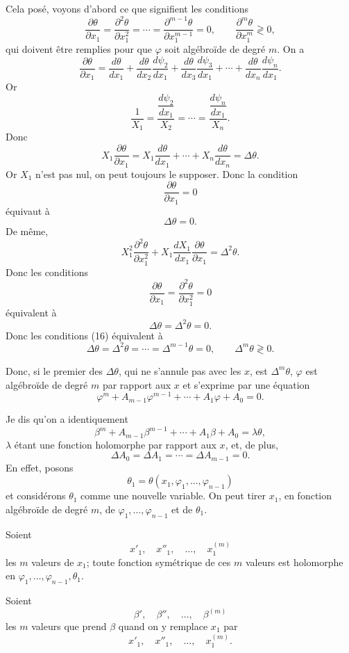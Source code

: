 \documentclass[11pt]{article}
\begin{document}
Cela posé, voyons d’abord ce que signifient les conditions
\begin{equation*}\tag{16}
\frac{\partial\theta}{\partial x_1}
=\frac{\partial^2\theta}{\partial x_1^2}
=\cdots=
\frac{\partial^{m-1}\theta}{\partial x_1^{m-1}}=0,
\qquad
\frac{\partial^m\theta}{\partial x_1^m}\gtrless0,
\end{equation*}
qui doivent être remplies pour que $\varphi$ soit algébroïde de degré $m$. On a
\[
\frac{\partial\theta}{\partial x_1}
=
\frac{d\theta}{dx_1}
+\frac{d\theta}{dx_2}\frac{d\psi_2}{dx_1}
+\frac{d\theta}{dx_3}\frac{d\psi_3}{dx_1}
+\cdots+
\frac{d\theta}{dx_n}\frac{d\psi_n}{dx_1}.
\]
Or
\[
\frac{1}{X_1}
=
\frac{\dfrac{d\psi_2}{dx_1}}{X_2}
=\cdots=
\frac{\dfrac{d\psi_n}{dx_1}}{X_n}.
\]
Donc
\[
X_1\frac{\partial\theta}{\partial x_1}
=
X_1\frac{d\theta}{dx_1}+\cdots+X_n\frac{d\theta}{dx_n}
=\Delta\theta.
\]
Or $X_1$ n’est pas nul, on peut toujours le supposer. Donc la condition
\[
\frac{\partial\theta}{\partial x_1}=0
\]
équivaut à
\[
\Delta\theta=0.
\]
De même,
\[
X_1^2\frac{\partial^2\theta}{\partial x_1^2}
+X_1\frac{dX_1}{dx_1}\frac{\partial\theta}{\partial x_1}
=\Delta^2\theta.
\]
Donc les conditions
\[
\frac{\partial\theta}{\partial x_1}
=
\frac{\partial^2\theta}{\partial x_1^2}
=0
\]
équivalent à
\[
\Delta\theta=\Delta^2\theta=0.
\]
Donc les conditions (16) équivalent à
\[
\Delta\theta=\Delta^2\theta=\cdots=\Delta^{m-1}\theta=0,
\qquad
\Delta^m\theta\gtrless0.
\]

Donc, si le premier des $\Delta\theta$, qui ne s’annule pas avec les $x$, est $\Delta^m\theta$, $\varphi$ est algébroïde de degré $m$ par rapport aux $x$ et s’exprime par une équation
\[
\varphi^m+A_{m-1}\varphi^{m-1}+\cdots+A_1\varphi+A_0=0.
\]

Je dis qu’on a identiquement
\[
\beta^m+A_{m-1}\beta^{m-1}+\cdots+A_1\beta+A_0=\lambda\theta,
\]
$\lambda$ étant une fonction holomorphe par rapport aux $x$, et, de plus,
\[
\Delta A_0=\Delta A_1=\cdots=\Delta A_{m-1}=0.
\]
En effet, posons
\[
\theta_1=\theta(x_1,\varphi_1,\ldots,\varphi_{n-1})
\]
et considérons $\theta_1$ comme une nouvelle variable. On peut tirer $x_1$, en fonction algébroïde de degré $m$, de $\varphi_1,\ldots,\varphi_{n-1}$ et de $\theta_1$.

Soient
\[
x'_1,\quad x''_1,\quad \ldots,\quad x_1^{(m)}
\]
les $m$ valeurs de $x_1$; toute fonction symétrique de ces $m$ valeurs est holomorphe en $\varphi_1,\ldots,\varphi_{n-1},\theta_1$.

Soient
\[
\beta',\quad \beta'',\quad \ldots,\quad \beta^{(m)}
\]
les $m$ valeurs que prend $\beta$ quand on y remplace $x_1$ par
\[
x'_1,\quad x''_1,\quad \ldots,\quad x_1^{(m)}.
\]
\end{document}
